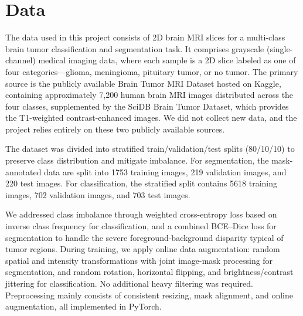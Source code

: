 \section{Data}
\label{sec:data}
The data used in this project consists of 2D brain MRI slices for a multi-class brain tumor classification and segmentation task. 
It comprises grayscale (single-channel) medical imaging data, where each sample is a 2D slice labeled as one of four categories—glioma, 
meningioma, pituitary tumor, or no tumor. The primary source is the publicly available Brain Tumor MRI Dataset hosted on Kaggle, containing 
approximately 7,200 human brain MRI images distributed across the four classes, supplemented by the SciDB Brain Tumor Dataset, which provides
 the T1-weighted contrast-enhanced images. We did not collect new data, and the project relies entirely on these two publicly available sources.

 The dataset was divided into stratified train/validation/test splits (80/10/10) to preserve class distribution and mitigate imbalance. For segmentation, the mask-annotated data are split into 1753 training images, 219 validation images, and 220 test images. For classification, the stratified split contains 5618 training images, 702 validation images, and 703 test images.

We addressed class imbalance through weighted cross-entropy loss based on inverse class frequency for classification, and a combined BCE--Dice loss for segmentation to handle the severe foreground-background disparity typical of tumor regions. During training, we apply online data augmentation: random spatial and intensity transformations with joint image-mask processing for segmentation, and random rotation, horizontal flipping, and brightness/contrast jittering for classification. No additional heavy filtering was required. Preprocessing mainly consists of consistent resizing, mask alignment, and online augmentation, all implemented in PyTorch.
    